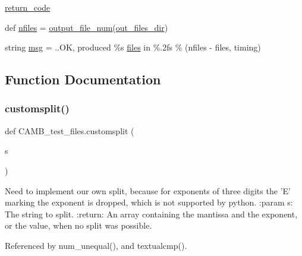 \begin{DoxyCompactItemize}
\item 
\mbox{\hyperlink{namespaceCAMB__test__files_aa0d4c1e1d81c9cc6e344e6858e1cef57}{return\+\_\+code}}
\item 
def \mbox{\hyperlink{namespaceCAMB__test__files_a168a759276e1aab6fe52615feb2e324a}{nfiles}} = \mbox{\hyperlink{namespaceCAMB__test__files_a2aa5d4f5677cf5a78388238c4dc45b7d}{output\+\_\+file\+\_\+num}}(\mbox{\hyperlink{namespaceCAMB__test__files_aab425eab53a3ec49aec1a01880b7bad7}{out\+\_\+files\+\_\+dir}})
\item 
string \mbox{\hyperlink{namespaceCAMB__test__files_abed78275c98420a4c677129c5a2a314c}{msg}} = \textquotesingle{}..OK, produced \%s \mbox{\hyperlink{namespaceCAMB__test__files_a830af4ed561145655ecc4f63423fd5b1}{files}} in \%.\+2fs\textquotesingle{} \% (nfiles -\/ files, timing)
\end{DoxyCompactItemize}


\subsection{Function Documentation}
\mbox{\label{namespaceCAMB__test__files_a279603bcda2879c085f8dc09c58baa73}} 
\subsubsection{\texorpdfstring{customsplit()}{customsplit()}}
{\footnotesize\ttfamily def C\+A\+M\+B\+\_\+test\+\_\+files.\+customsplit (\begin{DoxyParamCaption}\item[{}]{s }\end{DoxyParamCaption})}

\begin{DoxyVerb}Need to implement our own split, because for exponents of three digits
the 'E' marking the exponent is dropped, which is not supported by python.
:param s: The string to split.
:return: An array containing the mantissa and the exponent, or the value, when no split was possible.
\end{DoxyVerb}
 

Referenced by num\+\_\+unequal(), and textualcmp().

